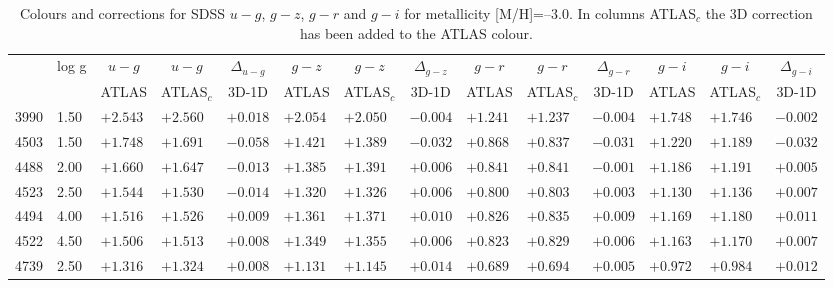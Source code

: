 \documentclass[]{aa}
\def\teff{$T\rm_{eff}$}
\begin{document}
\begin{appendix}
\begin{table*}
\caption{\label{SDSS_1_m30}
Colours and corrections for  SDSS $u-g$, $g-z$, $g-r$ and $g-i$ for metallicity [M/H]=--3.0. In columns ATLAS$_c$ the 3D correction
has been added to the ATLAS colour.  }
\renewcommand{\tabcolsep}{3pt}
\tabskip=0pt
\begin{center}
\begin{tabular}{llllllllllllll}
\hline\noalign{\smallskip}
\multicolumn{1}{c}{\teff} & 
\multicolumn{1}{c}{log g} & 
\multicolumn{1}{c}{$u-g$} &
\multicolumn{1}{c}{$u-g$} &
\multicolumn{1}{c}{$\Delta_{u-g}$} &
\multicolumn{1}{c}{$g-z$} &
\multicolumn{1}{c}{$g-z$} &
\multicolumn{1}{c}{$\Delta_{g-z}$} &
\multicolumn{1}{c}{$g-r$} &
\multicolumn{1}{c}{$g-r$} &
\multicolumn{1}{c}{$\Delta_{g-r}$} & 
\multicolumn{1}{c}{$g-i$} &
\multicolumn{1}{c}{$g-i$} &
\multicolumn{1}{c}{$\Delta_{g-i}$} \\
\multicolumn{2}{c}{ } &  
\multicolumn{1}{c}{ATLAS} &
\multicolumn{1}{c}{ATLAS$_c$}&
\multicolumn{1}{c}{3D-1D}&
\multicolumn{1}{c}{ATLAS} &
\multicolumn{1}{c}{ATLAS$_c$}&
\multicolumn{1}{c}{3D-1D}&
\multicolumn{1}{c}{ATLAS} &
\multicolumn{1}{c}{ATLAS$_c$}&
\multicolumn{1}{c}{3D-1D}&
\multicolumn{1}{c}{ATLAS} &
\multicolumn{1}{c}{ATLAS$_c$}&
\multicolumn{1}{c}{3D-1D} \\
\hline\noalign{\smallskip}
\hline\noalign{\smallskip}
3990  &1.50 & $+2.543$ & $+2.560$ & $+0.018$ & $+2.054$ & $+2.050$ & $-0.004$ & $+1.241$ & $+1.237$ & $-0.004$ & $+1.748$ & $+1.746$ & $-0.002$ \\
4503  &1.50 & $+1.748$ & $+1.691$ & $-0.058$ & $+1.421$ & $+1.389$ & $-0.032$ & $+0.868$ & $+0.837$ & $-0.031$ & $+1.220$ & $+1.189$ & $-0.032$ \\
4488  &2.00 & $+1.660$ & $+1.647$ & $-0.013$ & $+1.385$ & $+1.391$ & $+0.006$ & $+0.841$ & $+0.841$ & $-0.001$ & $+1.186$ & $+1.191$ & $+0.005$ \\
4523  &2.50 & $+1.544$ & $+1.530$ & $-0.014$ & $+1.320$ & $+1.326$ & $+0.006$ & $+0.800$ & $+0.803$ & $+0.003$ & $+1.130$ & $+1.136$ & $+0.007$ \\
4494  &4.00 & $+1.516$ & $+1.526$ & $+0.009$ & $+1.361$ & $+1.371$ & $+0.010$ & $+0.826$ & $+0.835$ & $+0.009$ & $+1.169$ & $+1.180$ & $+0.011$ \\
4522  &4.50 & $+1.506$ & $+1.513$ & $+0.008$ & $+1.349$ & $+1.355$ & $+0.006$ & $+0.823$ & $+0.829$ & $+0.006$ & $+1.163$ & $+1.170$ & $+0.007$ \\
4739  &2.50 & $+1.316$ & $+1.324$ & $+0.008$ & $+1.131$ & $+1.145$ & $+0.014$ & $+0.689$ & $+0.694$ & $+0.005$ & $+0.972$ & $+0.984$ & $+0.012$ \\

\end{tabular}
\end{center}
\end{table*}
\end{appendix}
\end{document}
